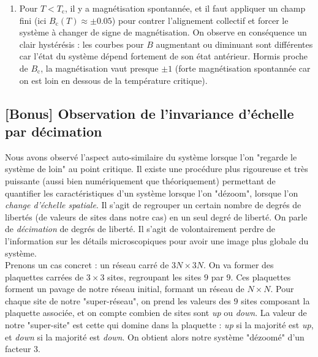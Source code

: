 \documentclass{book}
\begin{document}
\begin{correction}
\begin{enumerate}
\item Pour $T<T_\text{c}$, il y a magnétisation spontannée, et il faut appliquer un champ fini (ici $B_\text{c}(T) \approx \pm 0.05$) pour contrer l'alignement collectif et forcer le système à changer de signe de magnétisation. On observe en conséquence un clair hystérésis : les courbes pour $B$ augmentant ou diminuant sont différentes car l'état du système dépend fortement de son état antérieur. Hormis proche de $B_\text{c}$, la magnétisation vaut presque $\pm 1$ (forte magnétisation spontannée car on est loin en dessous de la température critique).
\end{enumerate}
\end{correction}

\subsection{[Bonus] Observation de l'invariance d'échelle par décimation}

Nous avons observé l'aspect auto-similaire du système lorsque l'on "regarde le système de loin" au point critique. Il existe une procédure plus rigoureuse et très puissante (aussi bien numériquement que théoriquement) permettant de quantifier les caractéristiques d'un système lorsque l'on "dézoom", lorsque l'on \emph{change d'échelle spatiale}. Il s'agit de regrouper un certain nombre de degrés de libertés (de valeurs de sites dans notre cas) en un seul degré de liberté. On parle de \emph{décimation} de degrés de liberté. Il s'agit de volontairement perdre de l'information sur les détails microscopiques pour avoir une image plus globale du système.\\

Prenons un cas concret : un réseau carré de $3N\times 3N$. On va former des plaquettes carrées de $3\times 3$ sites, regroupant les sites $9$ par $9$. Ces plaquettes forment un pavage de notre réseau initial, formant un réseau de $N\times N$. Pour chaque site de notre "super-réseau", on prend les valeurs des $9$ sites composant la plaquette associée, et on compte combien de sites sont \emph{up} ou \emph{down}. La valeur de notre "super-site" est cette qui domine dans la plaquette : \emph{up} si la majorité est \emph{up}, et \emph{down} si la majorité est \emph{down}. On obtient alors notre système "dézoomé" d'un facteur 3.\\
\end{document}
